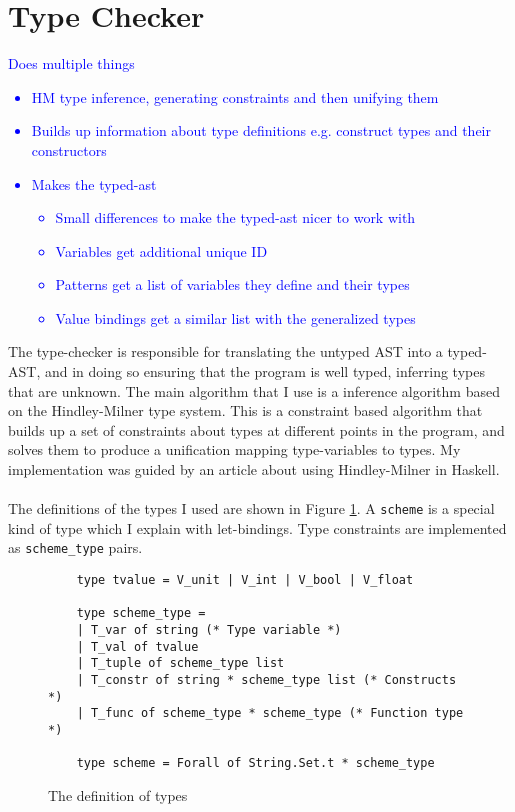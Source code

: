 \documentclass[12pt,twoside,notitlepage]{report}
\newcommand{\camlinline}{\texttt}
\newcommand\note[1]{\textcolor{blue}{#1}}
\begin{document}
\section{Type Checker}
\note{
	Does multiple things
	\begin{itemize}
		\item HM type inference, generating constraints and then unifying them
		\item Builds up information about type definitions e.g. construct types and their constructors
		\item Makes the typed-ast
		\begin{itemize}
			\item Small differences to make the typed-ast nicer to work with
			\item Variables get additional unique ID
			\item Patterns get a list of variables they define and their types
			\item Value bindings get a similar list with the generalized types
		\end{itemize}
	\end{itemize}
}
The type-checker is responsible for translating the untyped AST into a typed-AST, and in doing so ensuring that the program is well typed, inferring types that are unknown. The main algorithm that I use is a inference algorithm based on the Hindley-Milner type system. This is a constraint based algorithm that builds up a set of constraints about types at different points in the program, and solves them to produce a unification mapping type-variables to types. My implementation was guided by an article about using Hindley-Milner in Haskell\cite{Hmi}.
\\\\
The definitions of the types I used are shown in Figure \ref{fig:types}. A \camlinline{scheme} is a special kind of type which I explain with let-bindings. Type constraints are implemented as \camlinline{scheme_type} pairs.
\begin{figure}
	\begin{verbatim}
	type tvalue = V_unit | V_int | V_bool | V_float
	
	type scheme_type =
	| T_var of string (* Type variable *)
	| T_val of tvalue
	| T_tuple of scheme_type list
	| T_constr of string * scheme_type list (* Constructs *)
	| T_func of scheme_type * scheme_type (* Function type *)
	
	type scheme = Forall of String.Set.t * scheme_type
	\end{verbatim}
	\caption{The definition of types}
	\label{fig:types}
\end{figure}
\end{document}
